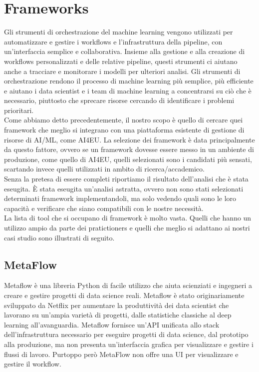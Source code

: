 \documentclass[12pt,a4paper]{report}
\begin{document}
\chapter{Frameworks}
Gli strumenti di orchestrazione del machine learning vengono utilizzati per automatizzare e gestire i workflows e l'infrastruttura della pipeline, con un'interfaccia semplice e collaborativa. Insieme alla gestione e alla creazione di workflows personalizzati e delle relative pipeline, questi strumenti ci aiutano anche a tracciare e monitorare i modelli per ulteriori analisi.
Gli strumenti di orchestrazione rendono il processo di machine learning più semplice, più efficiente e aiutano i data scientist e i team di machine learning a concentrarsi su ciò che è necessario, piuttosto che sprecare risorse cercando di identificare i problemi prioritari.\\
Come abbiamo detto precedentemente, il nostro scopo è quello di cercare quei framework che meglio si integrano con una piattaforma esistente di gestione di risorse di AI/ML, come AI4EU. La selezione dei framework è data principalmente da questo fattore, ovvero se un framework dovesse essere messo in un ambiente di produzione, come quello di AI4EU, quelli selezionati sono i candidati più sensati, scartando invece quelli utilizzati in ambito di ricerca/accademico.\\
Senza la pretesa di essere completi riportiamo il risultato dell'analisi che è stata eseugita.
È stata eseugita un'analisi astratta, ovvero non sono stati selezionati determinati framework implementandoli, ma solo vedendo quali sono le loro capacità e verificare che siano compatibili con le nostre necessità.\\
La lista di tool che si occupano di framework è molto vasta. Quelli che hanno un utilizzo ampio da parte dei pratictioners e quelli che meglio si adattano ai nostri casi studio sono illustrati di seguito.

\section{MetaFlow}
Metaflow è una libreria Python di facile utilizzo che aiuta scienziati e ingegneri a creare e gestire progetti di data science reali. Metaflow è stato originariamente sviluppato da Netflix per aumentare la produttività dei data scientist che lavorano su un'ampia varietà di progetti, dalle statistiche classiche al deep learning all'avanguardia. \cite{MetaFLow}
Metaflow fornisce un'API unificata allo stack dell'infrastruttura necessario per eseguire progetti di data science, dal prototipo alla produzione, ma non presenta un'interfaccia grafica per visualizzare e gestire i flussi di lavoro.
Purtoppo però MetaFlow non offre una UI per visualizzare e gestire il workflow.\\
\end{document}
